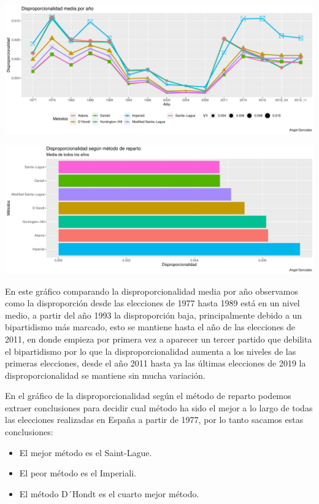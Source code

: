 \documentclass[12pt,a4paper,]{book}
\providecommand{\tightlist}{%
  \setlength{\itemsep}{0pt}\setlength{\parskip}{0pt}}
\numberwithin{dummy}{section}
\theoremstyle{ocrenumbox}
\theoremstyle{blacknumex}
\theoremstyle{blacknumbox}
\theoremstyle{ocrenum}
\theoremstyle{ocrenum}
\begin{document}
\begin{center}\includegraphics[width=0.95\linewidth]{figurasR/unnamed-chunk-187-1} \end{center}

\begin{center}\includegraphics[width=0.95\linewidth]{figurasR/unnamed-chunk-187-2} \end{center}

En este gráfico comparando la disproporcionalidad media por año
observamos como la disproporción desde las elecciones de 1977 hasta 1989
está en un nivel medio, a partir del año 1993 la disproporción baja,
principalmente debido a un bipartidismo más marcado, esto se mantiene
hasta el año de las elecciones de 2011, en donde empieza por primera vez
a aparecer un tercer partido que debilita el bipartidismo por lo que la
disproporcionalidad aumenta a los niveles de las primeras elecciones,
desde el año 2011 hasta ya las últimas elecciones de 2019 la
disproporcionalidad se mantiene sin mucha variación.

En el gráfico de la disproporcionalidad según el método de reparto
podemos extraer conclusiones para decidir cual método ha sido el mejor a
lo largo de todas las elecciones realizadas en España a partir de 1977,
por lo tanto sacamos estas conclusiones:

\begin{itemize}
\tightlist
\item
  El mejor método es el Saint-Lague.
\item
  El peor método es el Imperiali.
\item
  El método D´Hondt es el cuarto mejor método.
\end{itemize}
\end{document}
